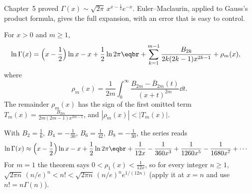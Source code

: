 Chapter~5 proved $\Gamma(x)\sim\sqrt{2\pi}\,x^{x-\frac12}e^{-x}$. Euler--Maclaurin, applied to Gauss's product formula, gives the full expansion, with an
error that is easy to control.

\begin{theorem}\label{thm:stirlingseries}
For $x>0$ and $m\ge1$,
\[
\begin{aligned}\ln\Gamma(x)&=\Bigl(x-\frac12\Bigr)\ln x-x+\frac12\ln2\pi\eqbr+\sum_{k=1}^{m-1}\frac{B_{2k}}{2k(2k-1)x^{2k-1}}+\rho_m(x),\end{aligned}
\]
where
\[
\rho_m(x)=\frac1{2m}\int_0^\infty\frac{B_{2m}-\bar B_{2m}(t)}{(x+t)^{2m}}\dd t.
\]
The remainder $\rho_m(x)$ has the sign of the first omitted term $T_m(x)=\frac{B_{2m}}{2m(2m-1)x^{2m-1}}$, and $|\rho_m(x)|<|T_m(x)|$.
\end{theorem}

With $B_2=\frac16$, $B_4=-\frac1{30}$, $B_6=\frac1{42}$, $B_8=-\frac1{30}$, the series reads
\[
\begin{aligned}\ln\Gamma(x)&\approx\Bigl(x-\frac12\Bigr)\ln x-x+\frac12\ln2\pi\eqbr+\frac1{12x}-\frac1{360x^3}+\frac1{1260x^5}-\frac1{1680x^7}+\cdots\end{aligned}
\]
For $m=1$ the theorem says $0<\rho_1(x)<\frac1{12x}$, so for every integer $n\ge1$,
$\sqrt{2\pi n}\,(n/e)^n<n!<\sqrt{2\pi n}\,(n/e)^ne^{1/(12n)}$ (apply it at $x=n$ and use $n!=n\Gamma(n)$).

